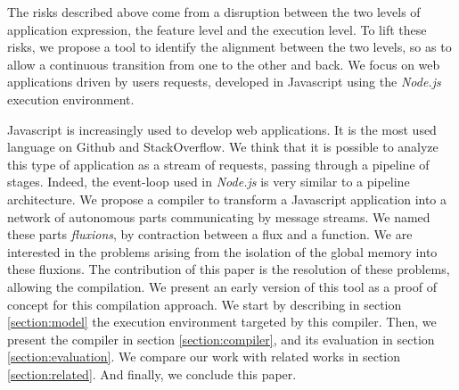 The risks described above come from a disruption between the two levels of application expression, the feature level and the execution level.
To lift these risks, we propose a tool to identify the alignment between the two levels, so as to allow a continuous transition from one to the other and back.
We focus on web applications driven by users requests, developed in Javascript using the \textit{Node.js} execution environment.

Javascript is increasingly used to develop web applications.
It is the most used language on Github and StackOverflow.
We think that it is possible to analyze this type of application as a stream of requests, passing through a pipeline of stages.
Indeed, the event-loop used in \textit{Node.js} is very similar to a pipeline architecture.
We propose a compiler to transform a Javascript application into a network of autonomous parts communicating by message streams.
We named these parts \textit{fluxions}, by contraction between a flux and a function.
We are interested in the problems arising from the isolation of the global memory into these fluxions.
The contribution of this paper is the resolution of these problems, allowing the compilation.
We present an early version of this tool as a proof of concept for this compilation approach.
We start by describing in section \ref{section:model} the execution environment targeted by this compiler.
Then, we present the compiler in section \ref{section:compiler}, and its evaluation in section \ref{section:evaluation}.
We compare our work with related works in section \ref{section:related}.
And finally, we conclude this paper.